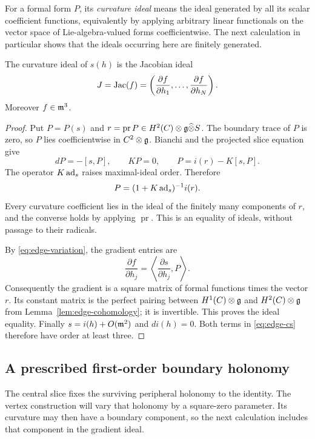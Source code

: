 For a formal form $P$, its \emph{curvature ideal} means the ideal
generated by all its scalar coefficient functions, equivalently by
applying arbitrary linear functionals on the vector space of
Lie-algebra-valued forms coefficientwise.  The next calculation in
particular shows that the ideals occurring here are finitely generated.

\begin{lemma}
\label{lem:edge-central-ideal}
The curvature ideal of $s(h)$ is the Jacobian ideal
\[
 J=\operatorname{Jac}(f)=\left(\frac{\partial f}{\partial h_1},\ldots,
                 \frac{\partial f}{\partial h_N}\right).
\]
Moreover $f\in\mathfrak{m}^3$.
\end{lemma}

\begin{proof}
Put $P=P(s)$ and $r=\operatorname{pr}P\in H^2(C)\otimes\mathfrak{g}
\widehat\otimes S$.  The boundary trace of $P$ is zero, so $P$ lies coefficientwise in $C^2\otimes\mathfrak{g}$.
Bianchi and the projected slice equation give
\begin{equation}
\label{eq:edge-central-curvature}
 dP=-[s,P],\qquad KP=0,
 \qquad P=i(r)-K[s,P].
\end{equation}
The operator $K\operatorname{ad}_s$ raises maximal-ideal order.  Therefore
\[
 P=(1+K\operatorname{ad}_s)^{-1}i(r).
\]
Every curvature coefficient lies in the ideal of the finitely many
components of $r$, and the converse holds by applying
$\operatorname{pr}$.  This is an equality of ideals, without passage to
their radicals.

By \eqref{eq:edge-variation}, the gradient entries are
\[
 \frac{\partial f}{\partial h_j}
    =\left\langle\frac{\partial s}{\partial h_j},P\right\rangle.
\]
Consequently the gradient is a square matrix of formal functions times
the vector $r$.  Its constant matrix is the perfect pairing between
$H^1(C)\otimes\mathfrak{g}$ and $H^2(C)\otimes\mathfrak{g}$ from
Lemma~\ref{lem:edge-cohomology}; it is invertible.  This proves the ideal
equality.  Finally $s=i(h)+O(\mathfrak{m}^2)$ and $di(h)=0$.  Both terms in
\eqref{eq:edge-cs} therefore have order at least three.
\end{proof}

\subsection{A prescribed first-order boundary holonomy}

The central slice fixes the surviving peripheral holonomy to the
identity. The vertex construction will vary that holonomy by a
square-zero parameter. Its curvature may then have a boundary
component, so the next calculation includes that component in the
gradient ideal.

